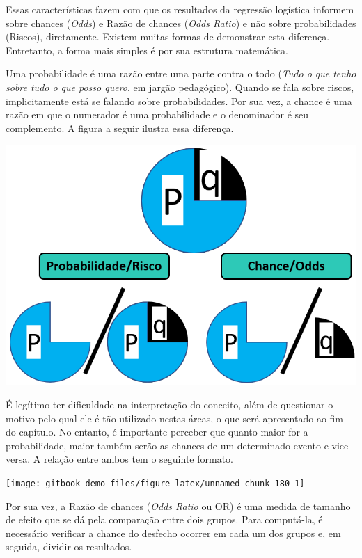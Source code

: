 \documentclass[
]{book}
\begin{document}
Essas características fazem com que os resultados da regressão logística informem sobre chances (\emph{Odds}) e Razão de chances (\emph{Odds Ratio}) e não sobre probabilidades (Riscos), diretamente. Existem muitas formas de demonstrar esta diferença. Entretanto, a forma mais simples é por sua estrutura matemática.

Uma probabilidade é uma razão entre uma parte contra o todo (\emph{Tudo o que tenho sobre tudo o que posso quero}, em jargão pedagógico). Quando se fala sobre riscos, implicitamente está se falando sobre probabilidades. Por sua vez, a chance é uma razão em que o numerador é uma probabilidade e o denominador é seu complemento. A figura a seguir ilustra essa diferença.

\includegraphics{./img/cap_reg_log_odds.png}

É legítimo ter dificuldade na interpretação do conceito, além de questionar o motivo pelo qual ele é tão utilizado nestas áreas, o que será apresentado ao fim do capítulo. No entanto, é importante perceber que quanto maior for a probabilidade, maior também serão as chances de um determinado evento e vice-versa. A relação entre ambos tem o seguinte formato.

\begin{center}\texttt{[image: gitbook-demo\_files/figure-latex/unnamed-chunk-180-1]} \end{center}

Por sua vez, a Razão de chances (\emph{Odds Ratio} ou OR) é uma medida de tamanho de efeito que se dá pela comparação entre dois grupos. Para computá-la, é necessário verificar a chance do desfecho ocorrer em cada um dos grupos e, em seguida, dividir os resultados.
\end{document}
